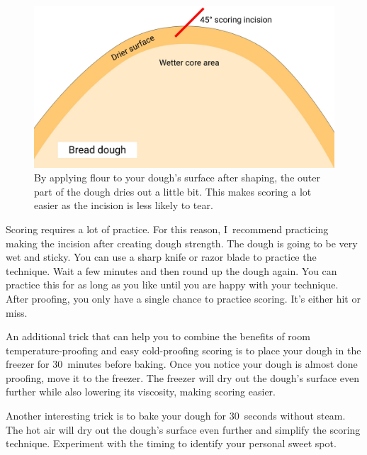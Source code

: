\begin{figure}[htb!]
  \centering
  \includegraphics[width=\textwidth]{dry-dough-surface}
  \caption[Drying the dough surface]{By applying flour to your dough's surface
      after shaping, the outer part of the dough dries out a little bit. This
      makes scoring a lot easier as the incision is less likely to tear.}%
  \label{fig:dried-out-dough-scoring}
\end{figure}


Scoring requires a lot of practice. For this reason, I~recommend
practicing making the incision after creating dough strength. The dough
is going to be very wet and sticky. You can use a sharp knife or razor
blade to practice the technique. Wait a few minutes and then round
up the dough again. You can practice this for as long as you like
until you are happy with your technique. After proofing, you only
have a single chance to practice scoring. It's either hit or miss.

An additional trick that can help you to combine the benefits
of room temperature-proofing and easy cold-proofing scoring
is to place your dough in the freezer for 30~minutes before baking.
Once you notice your dough is almost done proofing, move it to the
freezer. The freezer will dry out the dough's surface even further
while also lowering its viscosity, making scoring easier.

Another interesting trick is to bake your dough for 30~seconds without steam.
The hot air will dry out the dough's surface even further and simplify
the scoring technique. Experiment with the timing to identify your personal
sweet spot.

